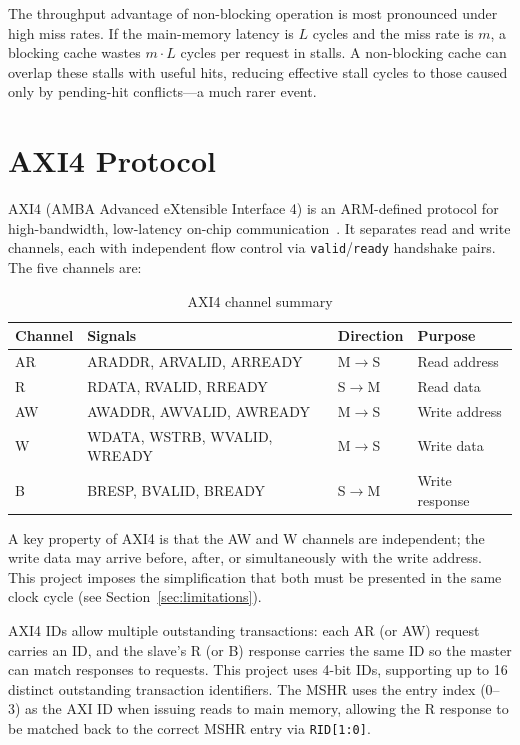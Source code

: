 \documentclass[12pt,letterpaper]{report}
\begin{document}
The throughput advantage of non-blocking operation is most pronounced
under high miss rates.  If the main-memory latency is $L$ cycles and
the miss rate is $m$, a blocking cache wastes $m \cdot L$ cycles per
request in stalls.  A non-blocking cache can overlap these stalls with
useful hits, reducing effective stall cycles to those caused only by
pending-hit conflicts---a much rarer event.

\section{AXI4 Protocol}

AXI4 (AMBA Advanced eXtensible Interface 4) is an ARM-defined protocol
for high-bandwidth, low-latency on-chip communication~\cite{amba_axi}.
It separates read and write channels, each with independent flow
control via \texttt{valid}/\texttt{ready} handshake pairs.  The five
channels are:

\begin{table}[h]
\centering
\caption{AXI4 channel summary}
\label{tab:axi_channels}
\begin{tabularx}{\textwidth}{@{}l>{\ttfamily\small}Xl X@{}}
\toprule
Channel & \normalfont Signals & Direction & Purpose \\
\midrule
AR & ARADDR, ARVALID, ARREADY & M$\to$S & Read address \\
R  & RDATA, RVALID, RREADY   & S$\to$M & Read data \\
AW & AWADDR, AWVALID, AWREADY & M$\to$S & Write address \\
W  & WDATA, WSTRB, WVALID, WREADY & M$\to$S & Write data \\
B  & BRESP, BVALID, BREADY   & S$\to$M & Write response \\
\bottomrule
\end{tabularx}
\end{table}

A key property of AXI4 is that the AW and W channels are independent;
the write data may arrive before, after, or simultaneously with the
write address.  This project imposes the simplification that both must
be presented in the same clock cycle (see Section~\ref{sec:limitations}).

AXI4 IDs allow multiple outstanding transactions: each AR (or AW)
request carries an ID, and the slave's R (or B) response carries the
same ID so the master can match responses to requests.  This project
uses 4-bit IDs, supporting up to 16 distinct outstanding transaction
identifiers.  The MSHR uses the entry index (0--3) as the AXI ID when
issuing reads to main memory, allowing the R response to be matched
back to the correct MSHR entry via \texttt{RID[1:0]}.
\end{document}
